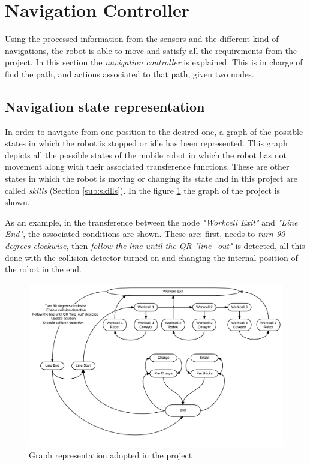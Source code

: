 \section{Navigation Controller} %
\label{sec:mr_navigation_controller}
Using the processed information from the sensors and the different kind of navigations, the robot is able to move and satisfy all the requirements from the project.
In this section the \emph{navigation controller} is explained.
This is in charge of find the path, and actions associated to that path, given two nodes.

\subsection{Navigation state representation} %
    \label{sub:mr_navigation_state_representation}
    In order to navigate from one position to the desired one, a graph of the possible states in which the robot is stopped or idle has been represented.
    This graph depicts all the possible states of the mobile robot in which the robot has not movement along with their associated transference functions. 
    These are other states in which the robot is moving or changing its state and in this project are called \emph{skills} (Section \ref{sub:skills}).
    In the figure \ref{fig:mr_graph} the graph of the project is shown.
    
    As an example, in the transference between the node \emph{"Workcell Exit"} and \emph{"Line End"}, the associated conditions are shown. 
    These are: first, needs to \emph{turn 90 degrees clockwise}, then \emph{follow the line until the QR "line\_out"} is detected, all this done with the collision detector turned on and changing the internal position of the robot in the end.

    \begin{figure}[ht!]
        \centering
        \includegraphics[width=\textwidth]{figs/mr_graph.pdf}
        \caption{Graph representation adopted in the project}
        \label{fig:mr_graph}
    \end{figure}

